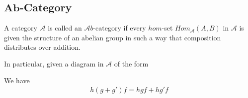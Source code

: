 \documentclass[Total.tex]{subfiles}
\begin{document}
			\subsection{$\mathbf{Ab}$-Category}
			\begin{Def}
				A category $\mathcal{A}$ is called an $\mathcal Ab$-category if every $hom$-set $Hom_\mathcal{A}(A,B)$ in $\mathcal{A}$ is given the structure of an abelian group in such a way that composition distributes over addition.
				
				In particular, given a diagram in $\mathcal{A}$ of the form
				\begin{center}
				\end{center}
				We have
				\begin{gather*}
					h(g+g')f=hgf+hg'f
				\end{gather*}
			\end{Def}
\end{document}

